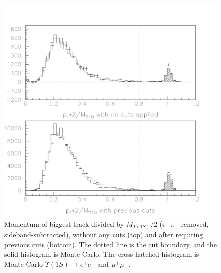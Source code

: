 \begin{figure}[p]
  \includegraphics[width=\linewidth]{plots/cascades_p1}
  \caption{\label{cascades_p1} Momentum of biggest track divided by
  $M_{\Upsilon(1S)}/2$ ($\pi^+\pi^-$ removed, sideband-subtracted),
  without any cuts (top) and after requiring previous cuts (bottom).
  The dotted line is the cut boundary, and the solid histogram is
  Monte Carlo.  The cross-hatched histogram is Monte Carlo
  $\Upsilon(1S) \to e^+e^-$ and $\mu^+\mu^-$.}
\end{figure}

